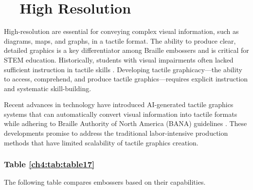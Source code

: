 \section{~~High Resolution }\label{ch4:sec:tactile-graphics}

High-resolution  are essential for conveying complex visual information, such as diagrams, maps, and graphs, in a tactile format. The ability to produce clear, detailed graphics is a key differentiator among Braille embossers and is critical for STEM education.\supercite{NYUMaps, TouchMapper} Historically, students with visual impairments often lacked sufficient instruction in tactile skills \supercite{TactileSkillsDevelopment}. Developing tactile graphicacy—the ability to access, comprehend, and produce tactile graphics—requires explicit instruction and systematic skill-building.

Recent advances in  technology have introduced AI-generated tactile graphics systems that can automatically convert visual information into tactile formats while adhering to Braille Authority of North America (BANA) guidelines \supercite{BrailleMathCodes, BANA}. These developments promise to address the traditional labor-intensive production methods that have limited scalability of tactile graphics creation.\supercite{ASUImageGen, BlindSVG}

\subsubsection{Table \ref{ch4:tab:table17}}
The following table compares embossers based on their  capabilities.

